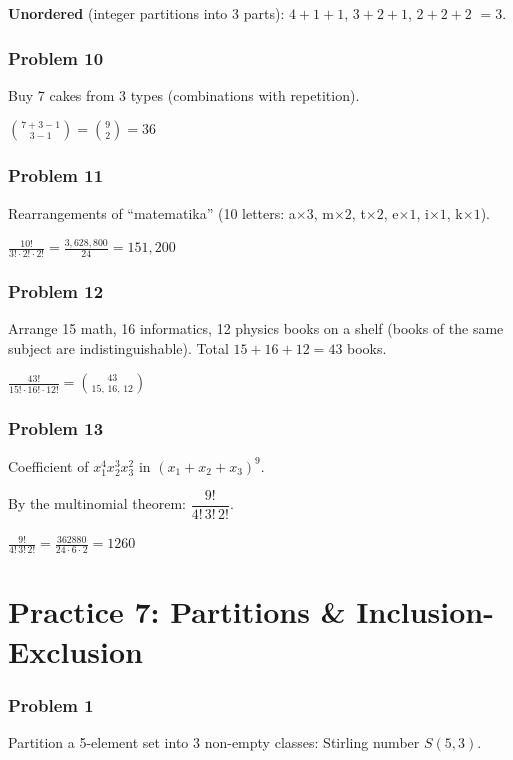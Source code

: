 \textbf{Unordered} (integer partitions into 3 parts): $4+1+1$, $3+2+1$, $2+2+2$ $= \boxed{3}$.

\subsubsection*{Problem 10}
Buy 7 cakes from 3 types (combinations with repetition).

$\boxed{\binom{7+3-1}{3-1} = \binom{9}{2} = 36}$

\subsubsection*{Problem 11}
Rearrangements of ``matematika'' (10 letters: a$\times 3$, m$\times 2$, t$\times 2$, e$\times 1$, i$\times 1$, k$\times 1$).

$\boxed{\frac{10!}{3!\cdot 2!\cdot 2!} = \frac{3{,}628{,}800}{24} = 151{,}200}$

\subsubsection*{Problem 12}
Arrange 15 math, 16 informatics, 12 physics books on a shelf (books of the same subject are indistinguishable). Total $15+16+12=43$ books.

$\boxed{\frac{43!}{15!\cdot 16!\cdot 12!} = \binom{43}{15,\,16,\,12}}$

\subsubsection*{Problem 13}
Coefficient of $x_1^4 x_2^3 x_3^2$ in $(x_1+x_2+x_3)^9$.

By the multinomial theorem: $\dfrac{9!}{4!\,3!\,2!}$.

$\boxed{\frac{9!}{4!\,3!\,2!} = \frac{362880}{24\cdot 6\cdot 2} = 1260}$

\section*{Practice 7: Partitions \& Inclusion-Exclusion}

\subsubsection*{Problem 1}
Partition a 5-element set into 3 non-empty classes: Stirling number $S(5,3)$.

